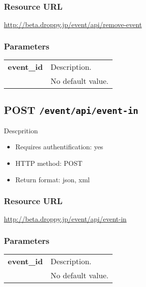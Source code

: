 \documentclass[11pt,a4paper]{article}
\newcommand{\content}[1]{\begin{minipage}{10cm}\vspace{2mm}#1\vspace{2mm}\end{minipage}}
\begin{document}
  \subsubsection*{Resource URL}
  \url{http://beta.droppy.jp/event/api/remove-event}
  \subsubsection*{Parameters}
  \begin{table}[h]
    \begin{center}
      \begin{tabular}{l l}
        \hline 
      \textbf{event\_id} & \content{Description. }
      \\
       & No default value.\\
      \hline
      \end{tabular}
    \end{center}
  \end{table}
  
      \newpage
      
      
  \subsection*{POST {\tt /event/api/event-in}}
  Descprition
  \begin{itemize}
  \item Requires authentification: yes
  \item HTTP method: POST
  \item Return format: json, xml
  \end{itemize}
  \subsubsection*{Resource URL}
  \url{http://beta.droppy.jp/event/api/event-in}
  \subsubsection*{Parameters}
  \begin{table}[h]
    \begin{center}
      \begin{tabular}{l l}
        \hline 
      \textbf{event\_id} & \content{Description. }
      \\
       & No default value.\\
      \hline
      \end{tabular}
    \end{center}
  \end{table}
  
\end{document}

